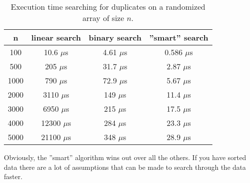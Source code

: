 \documentclass[a4paper,11pt]{article}
\begin{document}
\begin{table}[H]
\centering
\begin{tabular}{|c|c|c|c|}
\hline
\textbf{n} & \textbf{linear search} & \textbf{binary search} & \textbf{''smart'' search} \\
\hline
	100 & 10.6 $\mu$s & 4.61 $\mu$s & 0.586 $\mu$s  \\
	500 & 205 $\mu$s & 31.7 $\mu$s & 2.87 $\mu$s \\
	1000 & 790 $\mu$s & 72.9 $\mu$s & 5.67 $\mu$s \\
	2000 & 3110 $\mu$s & 149 $\mu$s & 11.4 $\mu$s \\
	3000 & 6950 $\mu$s & 215 $\mu$s & 17.5 $\mu$s \\
	4000 & 12300 $\mu$s & 284 $\mu$s & 23.3 $\mu$s \\
	5000 & 21100 $\mu$s & 348 $\mu$s & 28.9 $\mu$s \\
\hline
\end{tabular}
\caption{Execution time searching for duplicates on a randomized array of size $n$.}
\label{tab:table4}
\end{table}

Obviously, the ''smart'' algorithm wins out over all the others. If you have sorted data there are a lot of assumptions that can be made to search through the data faster.
\end{document}

